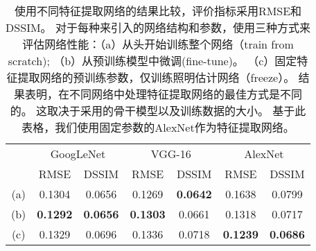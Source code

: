 \begin{table}[ht]
    \centering
    \begin{tabular}{c|c|c|c|c|c|c} 
     \hline
    \multirow{2}{*}{}  & \multicolumn{2}{c|}{GoogLeNet} & \multicolumn{2}{c|}{VGG-16} & \multicolumn{2}{c}{AlexNet} \\ \cline{2-7}
    ~&RMSE&DSSIM&RMSE&DSSIM&RMSE&DSSIM\\
    \hline
    (a) & 0.1304 & 0.0656 & 0.1269 & \textbf{0.0642} & 0.1638 & 0.0799 \\
    (b) & \textbf{0.1292} & \textbf{0.0656} & \textbf{0.1303} & 0.0661 & 0.1318 & 0.0717 \\
    (c) & 0.1329 & 0.0696 & 0.1336 & 0.0718 & \textbf{0.1239} & \textbf{0.0686} \\
    \hline 
    \end{tabular}
    \caption[不同特征提取网络的对比]{
    \label{table:backbone}
    使用不同特征提取网络的结果比较，评价指标采用RMSE和DSSIM。 对于每种来引入的网络结构和参数，使用三种方式来评估网络性能：（a）从头开始训练整个网络（train from scratch); （b）从预训练模型中微调(fine-tune)。 （c）固定特征提取网络的预训练参数，仅训练照明估计网络（freeze）。 结果表明，在不同网络中处理特征提取网络的最佳方式是不同的。 这取决于采用的骨干模型以及训练数据的大小。 基于此表格，我们使用固定参数的AlexNet作为特征提取网络。
    }
\end{table}